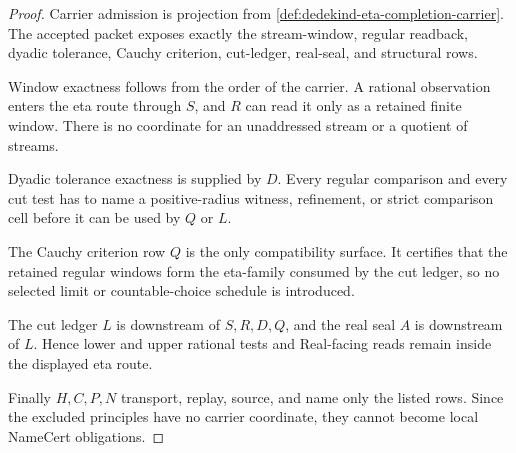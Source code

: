 \begin{proof}
Carrier admission is projection from \autoref{def:dedekind-eta-completion-carrier}. The accepted packet exposes exactly the stream-window, regular readback, dyadic tolerance, Cauchy criterion, cut-ledger, real-seal, and structural rows.

Window exactness follows from the order of the carrier. A rational observation enters the eta route through $S$, and $R$ can read it only as a retained finite window. There is no coordinate for an unaddressed stream or a quotient of streams.

Dyadic tolerance exactness is supplied by $D$. Every regular comparison and every cut test has to name a positive-radius witness, refinement, or strict comparison cell before it can be used by $Q$ or $L$.

The Cauchy criterion row $Q$ is the only compatibility surface. It certifies that the retained regular windows form the eta-family consumed by the cut ledger, so no selected limit or countable-choice schedule is introduced.

The cut ledger $L$ is downstream of $S,R,D,Q$, and the real seal $A$ is downstream of $L$. Hence lower and upper rational tests and Real-facing reads remain inside the displayed eta route.

Finally $H,C,P,N$ transport, replay, source, and name only the listed rows. Since the excluded principles have no carrier coordinate, they cannot become local NameCert obligations.
\end{proof}

